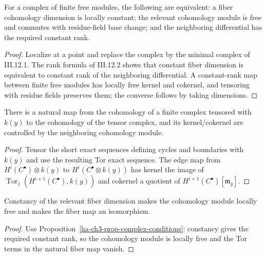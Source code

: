 \begin{proposition}\label{ha-ch3-prop-complex-conditions}
For a complex of finite free modules, the following are equivalent: a fiber
cohomology dimension is locally constant; the relevant cohomology module is
free and commutes with residue-field base change; and the neighboring
differential has the required constant rank.

\end{proposition}
\begin{proof}

Localize at a point and replace the complex by the minimal complex of III.12.1.  The rank formula of
III.12.2 shows that constant fiber dimension is equivalent to constant rank of the neighboring
differential.  A constant-rank map between finite free modules has locally free kernel and cokernel,
and tensoring with residue fields preserves them; the converse follows by taking dimensions.

\end{proof}
\begin{proposition}\label{ha-ch3-prop-fiber-map}
There is a natural map from the cohomology of a finite complex tensored with
$k(y)$ to the cohomology of the tensor complex, and its kernel/cokernel are
controlled by the neighboring cohomology module.

\end{proposition}
\begin{proof}

Tensor the short exact sequences defining cycles and boundaries with $k(y)$ and use the resulting
Tor exact sequence.  The edge map from $H^i(C^\bullet)\otimes k(y)$ to $H^i(C^\bullet\otimes k(y))$
has kernel the image of $\operatorname{Tor}_1(H^{i+1}(C^\bullet),k(y))$ and cokernel a quotient of
$H^{i+1}(C^\bullet)[\mathfrak m_y]$.

\end{proof}
\begin{corollary}\label{ha-ch3-cor-local-free-cohomology}
Constancy of the relevant fiber dimension makes the cohomology module locally
free and makes the fiber map an isomorphism.
\end{corollary}
\begin{proof}

Use Proposition~\ref{ha-ch3-prop-complex-conditions}: constancy gives the required constant rank,
so the cohomology module is locally free and the Tor terms in the natural fiber map vanish.

\end{proof}
